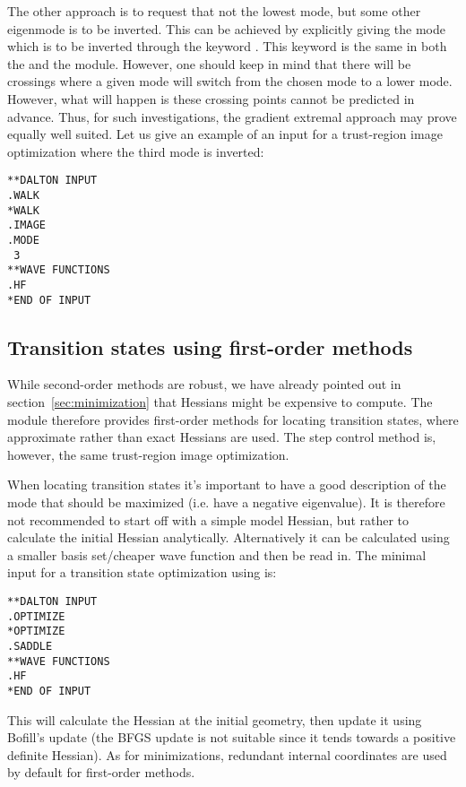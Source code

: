 The other approach is to request
that not the lowest mode, but some other eigenmode is to be inverted.
This can be achieved by explicitly giving the mode which is to be
inverted through the keyword . This keyword is the same in
both the  and the  module. However, one
should keep in mind that there will be crossings where a given mode
will switch from the chosen mode to a lower mode. However, what will happen
is these crossing points cannot be predicted in advance. Thus, for such
investigations, the gradient extremal approach may prove equally well
suited. Let us give an example of an input for a trust-region
image optimization where the third mode is inverted:

\begin{verbatim}
**DALTON INPUT
.WALK
*WALK
.IMAGE
.MODE
 3
**WAVE FUNCTIONS
.HF
*END OF INPUT
\end{verbatim}

\subsection{Transition states using first-order
methods}\label{sec:saddle1stord}

While second-order methods are robust, we have already pointed out
in section~\ref{sec:minimization} that Hessians might be expensive to
compute. The  module therefore provides first-order
methods for locating transition states, where approximate rather than
exact Hessians are used. The step control method is, however, the same
trust-region image optimization.

When locating transition states it's important to have a good
description of the mode that should be maximized (i.e. have a negative
eigenvalue). It is therefore not recommended to start off with a
simple model Hessian, but rather to calculate the initial Hessian
analytically. Alternatively it can be calculated using a smaller basis
set/cheaper wave function and then be read in. The minimal input for a
transition state optimization using  is:
\begin{verbatim}
**DALTON INPUT
.OPTIMIZE
*OPTIMIZE
.SADDLE
**WAVE FUNCTIONS
.HF
*END OF INPUT
\end{verbatim}
This will calculate the Hessian at the initial geometry, then update
it using Bofill's update\cite{jmbjcc15} (the BFGS update is not suitable since
it tends towards a positive definite Hessian). As for minimizations,
redundant internal coordinates are used by default for first-order
methods.

